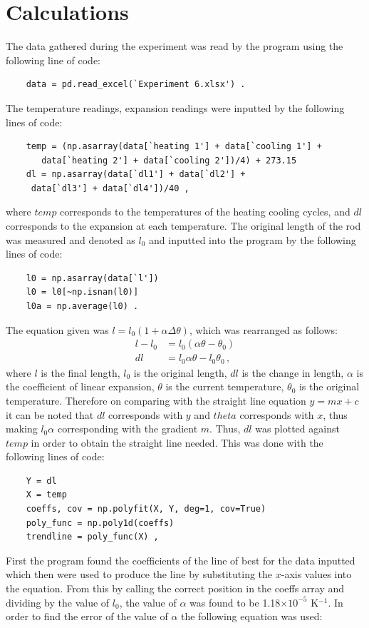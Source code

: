 \documentclass[12pt, a4paper]{article}
\begin{document}
\section*{Calculations}
The data gathered during the experiment was read by the program using the following line of code:
\begin{lstlisting}
    data = pd.read_excel(`Experiment 6.xlsx') .
\end{lstlisting}
The temperature readings, expansion readings were inputted by the following lines of code:
\begin{lstlisting}
    temp = (np.asarray(data[`heating 1'] + data[`cooling 1'] +
       data[`heating 2'] + data[`cooling 2'])/4) + 273.15
    dl = np.asarray(data[`dl1'] + data[`dl2'] + 
     data[`dl3'] + data[`dl4'])/40 ,
\end{lstlisting}
where $temp$ corresponds to the temperatures of the heating cooling cycles, and $dl$ corresponds to the expansion at each temperature. The original length of the rod was measured and denoted as $l_0$ and inputted into the program by the following lines of code:
\begin{lstlisting}
    l0 = np.asarray(data[`l'])
    l0 = l0[~np.isnan(l0)]
    l0a = np.average(l0) .
\end{lstlisting}
The equation given was $l=l_0(1+\alpha\Delta\theta)$, which was rearranged as follows:
\begin{align*}
    l-l_0&=l_0(\alpha\theta-\theta_0)\\
    dl&=l_0\alpha\theta-l_0\theta_0\,,
\end{align*}
where $l$ is the final length, $l_0$ is the original length, $dl$ is the change in length, $\alpha$ is the coefficient of linear expansion, $\theta$ is the current temperature, $\theta_0$ is the original temperature. Therefore on comparing with the straight line equation $y=mx+c$ it can be noted that $dl$ corresponds with $y$ and $theta$ corresponds with $x$, thus making $l_0\alpha$ corresponding with the gradient $m$. Thus, $dl$ was plotted against $temp$ in order to obtain the straight line needed. This was done with the following lines of code:
\begin{lstlisting}
    Y = dl
    X = temp
    coeffs, cov = np.polyfit(X, Y, deg=1, cov=True)
    poly_func = np.poly1d(coeffs)
    trendline = poly_func(X) ,
\end{lstlisting}
First the program found the coefficients of the line of best for the data inputted which then were used to produce the line by substituting the $x$-axis values into the equation. From this by calling the correct position in the coeffs array and dividing by the value of $l_0$, the value of $\alpha$ was found to be 1.18$\times10^{-5}$ K$^{-1}$. In order to find the error of the value of $\alpha$ the following equation was used:
\end{document}
